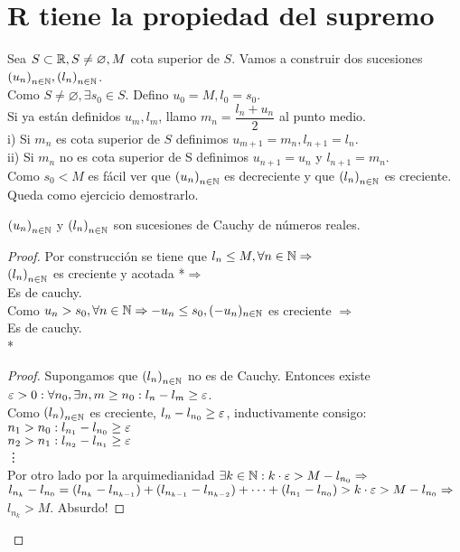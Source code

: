 \section{R tiene la propiedad del supremo}

Sea \(S \subset \mathbb{R}, S \neq \varnothing, M\) cota superior de \(S\). Vamos a construir dos sucesiones \({(u_n)}_{n \in \mathbb{N}}, {(l_n)}_{n \in \mathbb{N}} \). \\
Como \(S \neq \varnothing, \exists s_0 \in S\). Defino \(u_0 = M, l_0 = s_0\). \\
Si ya están definidos \(u_m, l_m\), llamo \(m_n = \dfrac{l_n+u_n}{2} \) al punto medio. \\
i) Si \(m_n\) es cota superior de \(S\) definimos \(u_{m+1} = m_n, l_{n+1} = l_n\). \\
ii) Si \(m_n\) no es cota superior de S definimos \(u_{n+1} = u_n\) y \(l_{n+1} = m_n\). \\
Como \(s_0 < M\) es fácil ver que \({(u_n)}_{n \in \mathbb{N}} \) es decreciente y que \({(l_n)}_{n \in \mathbb{N}} \) es creciente. Queda como ejercicio demostrarlo.

\begin{lemma}
	\({(u_n)}_{n \in \mathbb{N}} \) y \({(l_n)}_{n \in \mathbb{N}} \) son sucesiones de Cauchy de números reales.
	\begin{proof}
		Por construcción se tiene que \(l_n \leq M, \forall n \in \mathbb{N} \Rightarrow \) \\
		\({(l_n)}_{n \in \mathbb{N}} \) es creciente y acotada *\(\Rightarrow \) \\
		Es de cauchy. \\

		Como \(u_n > s_0, \forall n \in \mathbb{N} \Rightarrow -u_n \leq s_0, (-u_n)_{n \in \mathbb{N}} \) es creciente \(\Rightarrow \) \\
		Es de cauchy. \\

		* \begin{proof}
			Supongamos que \({(l_n)}_{n \in \mathbb{N}} \) no es de Cauchy. Entonces existe \(\varepsilon > 0 : \forall n_0, \exists n, m \geq n_0 : l_n - l_m \geq \varepsilon \). \\
			Como \({(l_n)}_{n \in \mathbb{N}} \) es creciente, \(l_n - l_{n_0} \geq \varepsilon \), inductivamente consigo: \\
			\(n_1 > n_0 : l_{n_1} - l_{n_0} \geq \varepsilon \) \\
			\(n_2 > n_1 : l_{n_2} - l_{n_1} \geq \varepsilon \) \\
			\vdots \\

			Por otro lado por la arquimedianidad \(\exists k \in \mathbb{N} : k \cdot \varepsilon > M - l_{n_0} \Rightarrow \) \\
			\(l_{n_k} - l_{n_0} = (l_{n_k} - l_{n_{k-1}}) + (l_{n_{k-1}} - l_{n_{k-2}}) + \cdots + (l_{n_1} - l_{n_0}) > k \cdot \varepsilon > M - l_{n_0} \Rightarrow \) \\
			\(l_{n_k} > M\). Absurdo!
		\end{proof}
	\end{proof}
\end{lemma}

